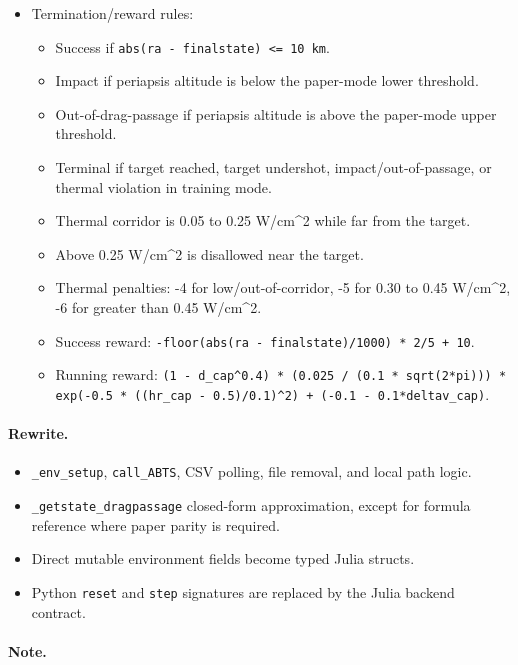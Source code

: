 \documentclass[11pt]{article}
\begin{document}
\begin{itemize}
\begin{itemize}
\end{itemize}
\item Termination/reward rules:
\begin{itemize}
\item Success if \texttt{abs(ra - finalstate) <= 10 km}.
\item Impact if periapsis altitude is below the paper-mode lower threshold.
\item Out-of-drag-passage if periapsis altitude is above the paper-mode upper threshold.
\item Terminal if target reached, target undershot, impact/out-of-passage, or thermal violation in training mode.
\item Thermal corridor is 0.05 to 0.25 W/cm\textasciicircum{}2 while far from the target.
\item Above 0.25 W/cm\textasciicircum{}2 is disallowed near the target.
\item Thermal penalties: -4 for low/out-of-corridor, -5 for 0.30 to 0.45 W/cm\textasciicircum{}2, -6 for greater than 0.45 W/cm\textasciicircum{}2.
\item Success reward: \texttt{-floor(abs(ra - finalstate)/1000) * 2/5 + 10}.
\item Running reward:
\texttt{(1 - d\_cap\textasciicircum{}0.4) * (0.025 / (0.1 * sqrt(2*pi))) * exp(-0.5 * ((hr\_cap - 0.5)/0.1)\textasciicircum{}2) + (-0.1 - 0.1*deltav\_cap)}.
\end{itemize}
\end{itemize}

\paragraph{Rewrite.}

\begin{itemize}
\item \texttt{\_env\_setup}, \texttt{call\_ABTS}, CSV polling, file removal, and local path logic.
\item \texttt{\_getstate\_dragpassage} closed-form approximation, except for formula reference where paper parity is required.
\item Direct mutable environment fields become typed Julia structs.
\item Python \texttt{reset} and \texttt{step} signatures are replaced by the Julia backend contract.
\end{itemize}

\paragraph{Note.}
\end{document}
